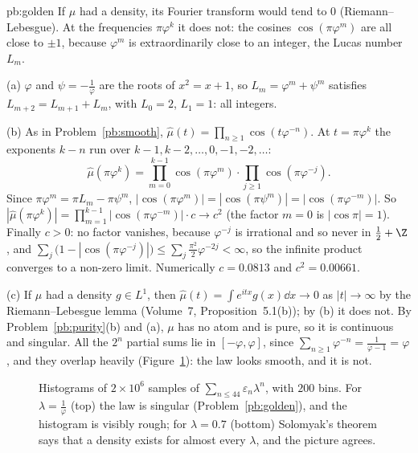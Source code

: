 \begin{solution}{pb:golden}
\idea If $\mu$ had a density, its Fourier transform would tend to $0$ (Riemann--Lebesgue). At the frequencies $\pi\varphi^k$ it does not: the cosines $\cos(\pi\varphi^m)$
are all close to $\pm1$, because $\varphi^m$ is extraordinarily close to an integer, the Lucas number $L_m$.

\writeup (a) $\varphi$ and $\psi=-\frac1\varphi$ are the roots of $x^2=x+1$, so $L_m=\varphi^m+\psi^m$ satisfies $L_{m+2}=L_{m+1}+L_m$, with $L_0=2$, $L_1=1$: all integers.

(b) As in Problem~\ref{pb:smooth}, $\hat\mu(t)=\prod_{n\ge1}\cos(t\varphi^{-n})$. At $t=\pi\varphi^k$ the exponents $k-n$ run over $k-1,k-2,\dots,0,-1,-2,\dots$:
\[
\hat\mu(\pi\varphi^k)=\prod_{m=0}^{k-1}\cos(\pi\varphi^m)\cdot\prod_{j\ge1}\cos(\pi\varphi^{-j}).
\]
Since $\pi\varphi^m=\pi L_m-\pi\psi^m$, $|\cos(\pi\varphi^m)|=|\cos(\pi\psi^m)|=|\cos(\pi\varphi^{-m})|$. So
$|\hat\mu(\pi\varphi^k)|=\prod_{m=1}^{k-1}|\cos(\pi\varphi^{-m})|\cdot c\to c^2$ (the factor $m=0$ is $|\cos\pi|=1$). Finally $c>0$: no factor vanishes, because $\varphi^{-j}$ is
irrational and so never in $\frac12+\Z$, and $\sum_j\bigl(1-|\cos(\pi\varphi^{-j})|\bigr)\le\sum_j\frac{\pi^2}2\varphi^{-2j}<\infty$, so the infinite product converges to a non-zero limit.
Numerically $c=0.0813$ and $c^2=0.00661$.

(c) If $\mu$ had a density $g\in L^1$, then $\hat\mu(t)=\int e^{itx}g(x)\dd x\to0$ as $|t|\to\infty$ by the Riemann--Lebesgue lemma (Volume~7, Proposition~5.1(b)); by (b) it does not.
By Problem~\ref{pb:purity}(b) and (a), $\mu$ has no atom and is pure, so it is continuous and singular. All the $2^n$ partial sums lie in $[-\varphi,\varphi]$, since
$\sum_{n\ge1}\varphi^{-n}=\frac1{\varphi-1}=\varphi$, and they overlap heavily (Figure~\ref{fig:golden}): the law looks smooth, and it is not.

\begin{figure}[ht]
\centering{}
\caption{Histograms of $2\times10^6$ samples of $\sum_{n\le44}\varepsilon_n\lambda^n$, with $200$ bins. For $\lambda=\frac1\varphi$ (top) the law is singular (Problem~\ref{pb:golden}),
and the histogram is visibly rough; for $\lambda=0.7$ (bottom) Solomyak's theorem says that a density exists for almost every $\lambda$, and the picture agrees.}
\label{fig:golden}
\end{figure}


\end{solution}
